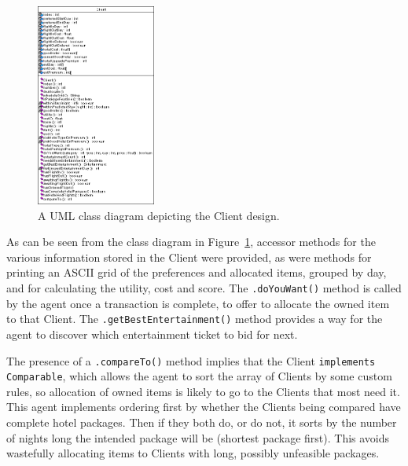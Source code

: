 \documentclass{acm_proc_article-sp}
\begin{document}
\begin{figure}
  \begin{center}
    \includegraphics[keepaspectratio=true, width=0.35\textwidth]{client2}
  \end{center}
  \caption{A UML class diagram depicting the Client design.}
  \label{client}
\end{figure}

  As can be seen from the class diagram in Figure~\ref{client}, accessor methods for the various information stored in the Client were provided, as were methods for printing an ASCII grid of the preferences and allocated items, grouped by day, and for calculating the utility, cost and score.  The \verb".doYouWant()" method is called by the agent once a transaction is complete, to offer to allocate the owned item to that Client.  The \verb".getBestEntertainment()" method provides a way for the agent to discover which entertainment ticket to bid for next.
  
  The presence of a \verb".compareTo()" method implies that the Client \verb"implements Comparable", which allows the agent to sort the array of Clients by some custom rules, so allocation of owned items is likely to go to the Clients that most need it.  This agent implements ordering first by whether the Clients being compared have complete hotel packages.  Then if they both do, or do not, it sorts by the number of nights long the intended package will be (shortest package first).  This avoids wastefully allocating items to Clients with long, possibly unfeasible packages.
  
\end{document}
